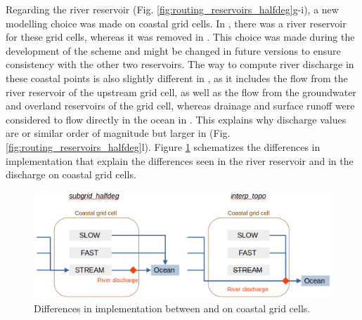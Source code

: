 \hfill

Regarding the river reservoir (Fig. \ref{fig:routing_reservoirs_halfdeg}g-i), a new modelling choice was made on coastal grid cells. In \std, there was a river reservoir for these grid cells, whereas it was removed in \native. This choice was made during the development of the scheme and might be changed in future versions to ensure consistency with the other two reservoirs. 
The way to compute river discharge in these coastal points is also slightly different in \native, as it includes the flow from the river reservoir of the upstream grid cell, as well as the flow from the groundwater and overland reservoirs of the grid cell, whereas drainage and surface runoff were considered to flow directly in the ocean in \std. This explains why discharge values are or similar order of magnitude but larger in \native (Fig. \ref{fig:routing_reservoirs_halfdeg}l). 
Figure \ref{fig:coastal_routing_behaviour} schematizes the differences in implementation that explain the differences seen in the river reservoir and in the discharge on coastal grid cells.

\begin{figure}[htbp]
    \centering
    \includegraphics[width=\textwidth]{images/chap3/coastal_routing_behaviour_v2.png
}
    \caption{Differences in implementation between \std and \native on coastal grid cells.}
    \label{fig:coastal_routing_behaviour}
\end{figure}

